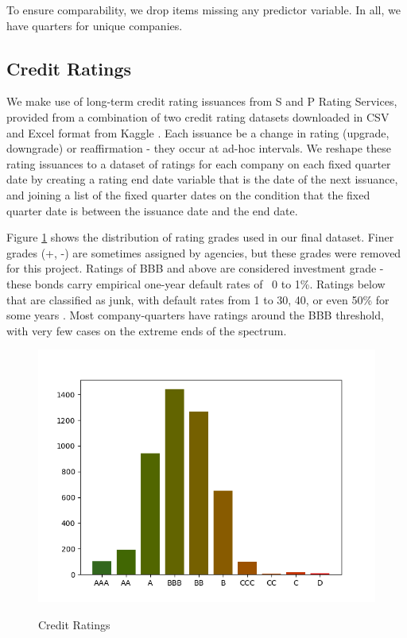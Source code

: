 \documentclass{article}[11pt]
\begin{document}
    To ensure comparability, we drop items missing any predictor variable. In all, we have \numQuarters \space quarters for \numCompanies \space unique companies.

    \subsection*{Credit Ratings}

    We make use of long-term credit rating issuances from S and P Rating Services, provided from a combination of two credit rating datasets downloaded in CSV and Excel format from Kaggle \citep{gewerc_corporate_2020,makwana_corporate_2022}. Each issuance be a change in rating (upgrade, downgrade) or reaffirmation - they occur at ad-hoc intervals. We reshape these rating issuances to a dataset of ratings for each company on each fixed quarter date by creating a rating end date variable that is the date of the next issuance, and joining a list of the fixed quarter dates on the condition that the fixed quarter date is between the issuance date and the end date.

    Figure \ref{fig:credit-ratings} shows the distribution of rating grades used in our final dataset. Finer grades (+, -) are sometimes assigned by agencies, but these grades were removed for this project. Ratings of BBB and above are considered investment grade - these bonds carry empirical one-year default rates of ~0 to 1\%. Ratings below that are classified as junk, with default rates from 1 to 30, 40, or even 50\% for some years \citep{s_and_p_global_ratings_s_2024}. Most company-quarters have ratings around the BBB threshold, with very few cases on the extreme ends of the spectrum.

    \begin{figure}[h!]
		\centering
        \caption{Credit Ratings}
        \includegraphics[width=0.5\linewidth,keepaspectratio=true]{../Output/All Data EDA/Tabular EDA/Distribution of Rating Issuances_no_title.png}
        \label{fig:credit-ratings}
	\end{figure}
\end{document}
